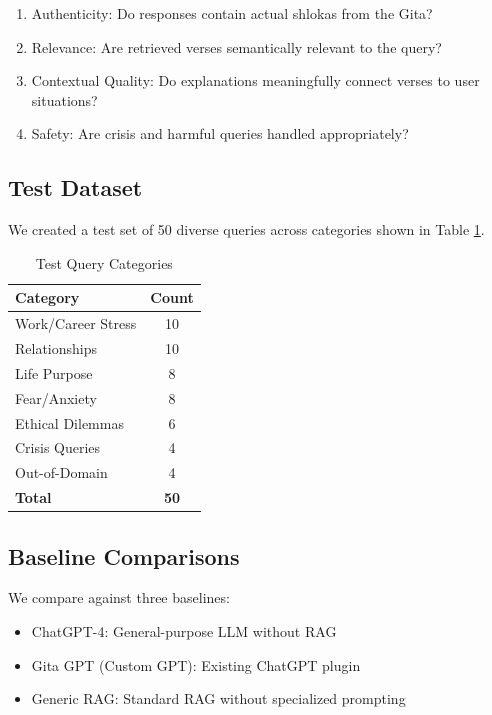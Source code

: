 \documentclass[conference]{IEEEtran}
\begin{document}
\begin{enumerate}
    \item Authenticity: Do responses contain actual shlokas from the Gita?
    \item Relevance: Are retrieved verses semantically relevant to the query?
    \item Contextual Quality: Do explanations meaningfully connect verses to user situations?
    \item Safety: Are crisis and harmful queries handled appropriately?
\end{enumerate}

\subsection{Test Dataset}

We created a test set of 50 diverse queries across categories shown in Table \ref{tab:testset}.

\begin{table}[htbp]
\caption{Test Query Categories}
\centering
\begin{tabular}{|l|c|}
\hline
\textbf{Category} & \textbf{Count} \\
\hline
Work/Career Stress & 10 \\
Relationships & 10 \\
Life Purpose & 8 \\
Fear/Anxiety & 8 \\
Ethical Dilemmas & 6 \\
Crisis Queries & 4 \\
Out-of-Domain & 4 \\
\hline
\textbf{Total} & \textbf{50} \\
\hline
\end{tabular}
\label{tab:testset}
\end{table}

\subsection{Baseline Comparisons}

We compare against three baselines:

\begin{itemize}
    \item ChatGPT-4: General-purpose LLM without RAG
    \item Gita GPT (Custom GPT): Existing ChatGPT plugin
    \item Generic RAG: Standard RAG without specialized prompting
\end{itemize}
\end{document}
